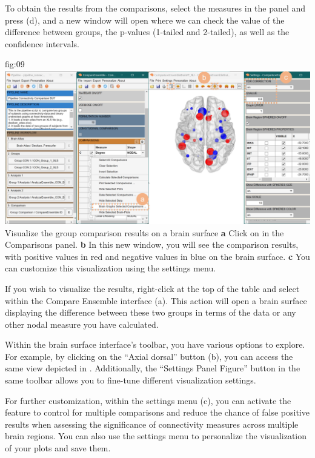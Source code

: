 \documentclass[justified]{tufte-handout}
\begin{document}
To obtain the results from the comparisons, select the measures in the  panel and press ({d}), and a new window will open where we can check the value of the difference between groups, the p-values (1-tailed and 2-tailed), as well as the confidence intervals.

	{fig:09}
	{
	\includegraphics{fig09.jpg}
	}
	{Visualize the group comparison results on a brain surface}
	{
	{\bf a} Click on  in the Comparisons panel.
	{\bf b} In this new window, you will see the comparison results, with positive values in red and negative values in blue on the brain surface.
{\bf c} You can customize this visualization using the settings menu.
	}

If you wish to visualize the results, right-click at the top of the table and select  within the Compare Ensemble interface (a). This action will open a brain surface displaying the difference between these two groups in terms of the  data or any other nodal measure you have calculated.

Within the brain surface interface's toolbar, you have various options to explore. For example, by clicking on the “Axial dorsal” button (b), you can access the same view depicted in . Additionally, the “Settings Panel Figure” button in the same toolbar allows you to fine-tune different visualization settings.

For further customization, within the settings menu (c), you can activate the  feature to control for multiple comparisons and reduce the chance of false positive results when assessing the significance of connectivity measures across multiple brain regions. You can also use the settings menu to personalize the visualization of your plots and save them.
\end{document}
